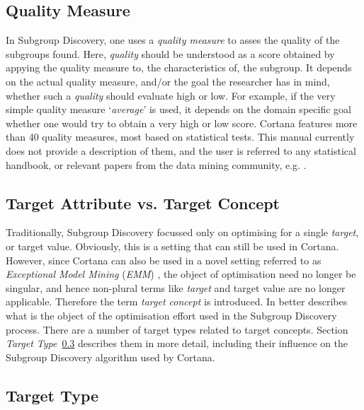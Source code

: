 \documentclass{article}
\begin{document}
\subsection{Quality Measure}
\label{preliminatier:quality-measure}
In Subgroup Discovery, one uses a \emph{quality measure} to asses the quality of the subgroups found.
Here, \emph{quality} should be understood as a score obtained by appying the quality measure to, the characteristics of, the subgroup.
It depends on the actual quality measure, and/or the goal the researcher has in mind, whether such a \emph{quality} should evaluate high or low.
For example, if the very simple quality measure `\emph{average}' is used, it depends on the domain specific goal whether one would try to obtain a very high or low score.
Cortana features more than 40 quality measures, most based on statistical tests.
This manual currently does not provide a description of them, and the user is referred to any statistical handbook, or relevant papers from the data mining community, e.g. \cite{shb,remauv}.



\subsection{Target Attribute vs. Target Concept}
\label{preliminaries:target-concept}
Traditionally, Subgroup Discovery focussed only on optimising for a single \emph{target}, or target value.
Obviously, this is a setting that can still be used in Cortana.
However, since Cortana can also be used in a novel setting referred to as \emph{Exceptional Model Mining} (\emph{EMM}) \cite{emm,sdmbn}, the object of optimisation need no longer be singular, and hence non-plural terms like \emph{target} and target value are no longer applicable.
Therefore the term \emph{target concept} is introduced.
In better describes what is the object of the optimisation effort used in the Subgroup Discovery process.
There are a number of target types related to target concepts.
Section \emph{Target Type}~\ref{preliminaries:target-type} describes them in more detail, including their influence on the Subgroup Discovery algorithm used by Cortana.



\subsection{Target Type}
\label{preliminaries:target-type}
\end{document}
